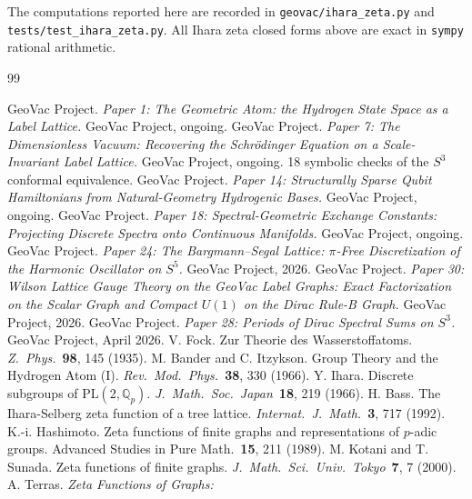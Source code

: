 \documentclass[11pt]{article}
\begin{document}
The computations reported here are recorded in
\texttt{geovac/ihara\_zeta.py} and \texttt{tests/test\_ihara\_zeta.py}.  All Ihara zeta closed
forms above are exact in \texttt{sympy} rational arithmetic.

\begin{thebibliography}{99}

 GeoVac Project.  \emph{Paper 1: The Geometric Atom:
the Hydrogen State Space as a Label Lattice.}  GeoVac Project, ongoing.
 GeoVac Project.  \emph{Paper 7: The Dimensionless
Vacuum: Recovering the Schr\"odinger Equation on a Scale-Invariant
Label Lattice.}  GeoVac Project, ongoing.  18 symbolic checks of the
$S^3$ conformal equivalence.
 GeoVac Project.  \emph{Paper 14: Structurally Sparse Qubit Hamiltonians from
Natural-Geometry Hydrogenic Bases.}  GeoVac Project, ongoing.
 GeoVac Project.  \emph{Paper 18: Spectral-Geometric
Exchange Constants: Projecting Discrete Spectra onto Continuous
Manifolds.}  GeoVac Project, ongoing.
 GeoVac Project.  \emph{Paper 24: The Bargmann--Segal
Lattice: $\pi$-Free Discretization of the Harmonic Oscillator on
$S^5$.}  GeoVac Project, 2026.
 GeoVac Project.  \emph{Paper 30: Wilson Lattice Gauge
Theory on the GeoVac Label Graphs: Exact Factorization on the Scalar Graph
and Compact $U(1)$ on the Dirac Rule-B Graph.}  GeoVac Project, 2026.
 GeoVac Project.  \emph{Paper 28: Periods of Dirac
Spectral Sums on $S^3$.}  GeoVac Project,
April 2026.
 V. Fock.  Zur Theorie des Wasserstoffatoms.
\emph{Z.\ Phys.}\ \textbf{98}, 145 (1935).
 M. Bander and C. Itzykson.  Group Theory and the
Hydrogen Atom (I).  \emph{Rev.\ Mod.\ Phys.}\ \textbf{38}, 330 (1966).
 Y. Ihara.  Discrete subgroups of $\mathrm{PL}(2,
\mathbb{Q}_p)$.  \emph{J.\ Math.\ Soc.\ Japan}\ \textbf{18}, 219 (1966).
 H. Bass.  The Ihara-Selberg zeta function of a
tree lattice.  \emph{Internat.\ J.\ Math.}\ \textbf{3}, 717 (1992).
 K.-i. Hashimoto.  Zeta functions of finite
graphs and representations of $p$-adic groups.  Advanced Studies in
Pure Math.\ \textbf{15}, 211 (1989).
 M. Kotani and T. Sunada.  Zeta functions of
finite graphs.  \emph{J.\ Math.\ Sci.\ Univ.\ Tokyo}\ \textbf{7}, 7
(2000).
 A. Terras.  \emph{Zeta Functions of Graphs:\
}
\end{thebibliography}
\end{document}

